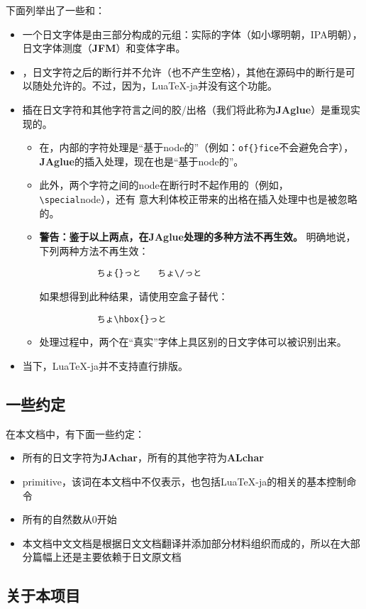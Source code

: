 \documentclass{ltjarticle}
\DeclareRobustCommand\LuaTeX{Lua\TeX}
\DeclareRobustCommand\pTeX{p\kern-.05em\TeX}
\begin{document}
下面列举出了一些和：
\begin{itemize}
\item 一个日文字体是由三部分构成的元组：实际的字体（如小塚明朝，IPA明朝），日文字体测度（\textbf{JFM}）和变体字串。
\item {}，日文字符之后的断行并不允许（也不产生空格），其他在源码中的断行是可以随处允许的。不过，因为，\LuaTeX-ja并没有这个功能。
\item 插在日文字符和其他字符言之间的胶/出格（我们将此称为\textbf{JAglue}）是重现实现的。
	\begin{itemize}
	\item 在，内部的字符处理是“基于node的”（例如：\verb!of{}fice!不会避免合字），
		\textbf{JAglue}的插入处理，现在也是“基于node的”。
	\item 此外，两个字符之间的node在断行时不起作用的（例如，\verb!\special!node），还有
		意大利体校正带来的出格在插入处理中也是被忽略的。
	\item \textbf{警告：鉴于以上两点，在\textbf{JAglue}处理的多种方法不再生效。}
		明确地说，下列两种方法不再生效：
		\begin{verbatim}
		　　ちょ{}っと　　ちょ\/っと
		\end{verbatim}
		如果想得到此种结果，请使用空盒子替代：
		\begin{verbatim}
		　　ちょ\hbox{}っと
		\end{verbatim}
	\item 处理过程中，两个在“真实”字体上具区别的日文字体可以被识别出来。
	\end{itemize}
\item 当下，\LuaTeX-ja并不支持直行排版。
\end{itemize}
\subsection{一些约定} 
在本文档中，有下面一些约定：
\begin{itemize}
\item 所有的日文字符为\textbf{JAchar}，所有的其他字符为\textbf{ALchar}
\item primitive，该词在本文档中不仅表示，也包括\LuaTeX-ja的相关的基本控制命令
\item 所有的自然数从0开始
\item 本文档中文文档是根据日文文档翻译并添加部分材料组织而成的，所以在大部分篇幅上还是主要依赖于日文原文档
\end{itemize}
\subsection{关于本项目}
\end{document}
